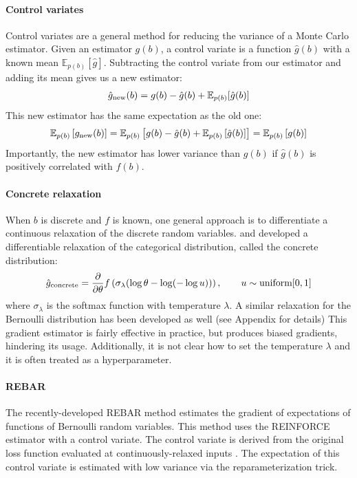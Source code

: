 \documentclass{article}
\newcommand{\controlf}{\hat g}  %
\newcommand{\PT}{\frac{\partial}{\partial \theta}}
\begin{document}
\paragraph{Control variates}
Control variates are a general method for reducing the variance of a Monte Carlo estimator.
Given an estimator $g(b)$, a control variate is a function $\controlf(b)$ with a known mean $\mathbb{E}_{p(b)} [ \controlf ]$.
Subtracting the control variate from our estimator and adding its mean gives us a new estimator:
%
\begin{align}
\hat g_\textnormal{new}(b) = g(b) - \controlf(b) + \mathbb{E}_{p(b)}[\controlf(b)]
\end{align}
%
This new estimator has the same expectation as the old one:
%
\begin{align}
\mathbb{E}_{p(b)}\left[ g_\textnormal{new}(b) \right] 
= \mathbb{E}_{p(b)}\left[g(b) - \controlf(b) + \mathbb{E}_{p(b)} \left[ \controlf(b) \right] \right]
= \mathbb{E}_{p(b)}\left[ g(b) \right]
\end{align}
%
Importantly, the new estimator has lower variance than $g(b)$ if $\controlf(b)$ is positively correlated with $f(b)$.

\paragraph{Concrete relaxation}
When $b$ is discrete and $f$ is known, one general approach is to differentiate a continuous relaxation of the discrete random variables.
\cite{maddison2016concrete} and \cite{jang2016categorical} developed a differentiable relaxation of the categorical distribution, called the concrete distribution:
%
\begin{align}
\hat g_\textnormal{concrete} = \PT f \left( \sigma_\lambda ( \log \theta - \log(-\log u)) \right), \qquad u \sim \textnormal{uniform}[0, 1] 
\end{align}
%
where $\sigma_\lambda$ is the softmax function with temperature $\lambda$. A similar relaxation for the Bernoulli distribution has been developed as well (see Appendix for details)
This gradient estimator is fairly effective in practice, but produces biased gradients, hindering its usage.
Additionally, it is not clear how to set the temperature $\lambda$ and it is often treated as a hyperparameter.

\paragraph{REBAR}
The recently-developed REBAR method \citep{tucker2017rebar} estimates the gradient of expectations of functions of Bernoulli random variables. This method uses the REINFORCE estimator with a control variate. The control variate is derived from the original loss function evaluated at continuously-relaxed inputs \citep{maddison2016concrete, jang2016categorical}. The expectation of this control variate is estimated with low variance via the reparameterization trick. 
\end{document}
